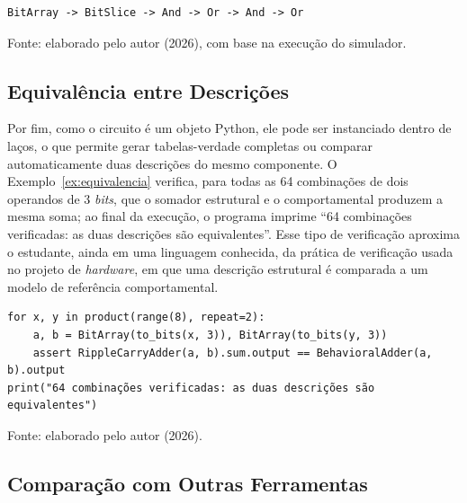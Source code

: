 \begin{quadro}[H]
\centering
\caption{Caminho da propagação impresso pelo Exemplo~\ref{ex:caminho}.}
\label{qua:caminho}
\begin{minipage}{0.6\textwidth}
\begin{verbatim}
BitArray -> BitSlice -> And -> Or -> And -> Or
\end{verbatim}
\end{minipage}
\begin{center}
\footnotesize Fonte: elaborado pelo autor (2026), com base na execução do simulador.
\end{center}
\end{quadro}

\subsection{Equivalência entre Descrições}

Por fim, como o circuito é um objeto Python, ele pode ser instanciado dentro de laços, o que permite gerar tabelas-verdade completas ou comparar automaticamente duas descrições do mesmo componente. O Exemplo~\ref{ex:equivalencia} verifica, para todas as 64 combinações de dois operandos de 3 \textit{bits}, que o somador estrutural e o comportamental produzem a mesma soma; ao final da execução, o programa imprime ``64 combinações verificadas: as duas descrições são equivalentes''. Esse tipo de verificação aproxima o estudante, ainda em uma linguagem conhecida, da prática de verificação usada no projeto de \textit{hardware}, em que uma descrição estrutural é comparada a um modelo de referência comportamental.

\begin{exemplo}[H]
\caption{Verificação exaustiva de equivalência entre as descrições estrutural e comportamental.}
\label{ex:equivalencia}
\begin{verbatim}
for x, y in product(range(8), repeat=2):
    a, b = BitArray(to_bits(x, 3)), BitArray(to_bits(y, 3))
    assert RippleCarryAdder(a, b).sum.output == BehavioralAdder(a, b).output
print("64 combinações verificadas: as duas descrições são equivalentes")
\end{verbatim}
\begin{center}
\footnotesize Fonte: elaborado pelo autor (2026).
\end{center}
\end{exemplo}

\subsection{Comparação com Outras Ferramentas}

